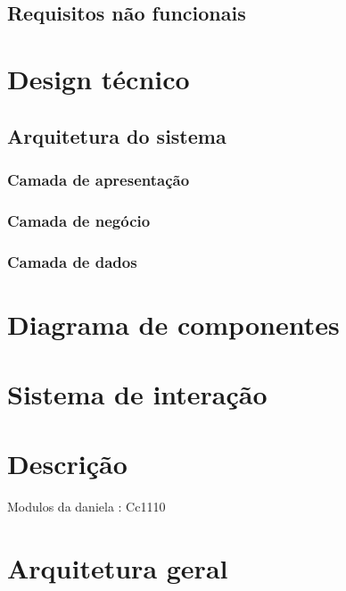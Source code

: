 \subsection{Requisitos não funcionais}







\section{Design técnico}



\subsection{Arquitetura do sistema}



\subsubsection{Camada de apresentação}


\subsubsection{Camada de negócio}



\subsubsection{Camada de dados}




\section{Diagrama de componentes}




\section{Sistema de interação}


\section{Descrição}


Modulos da daniela : Cc1110



\section{Arquitetura geral}


